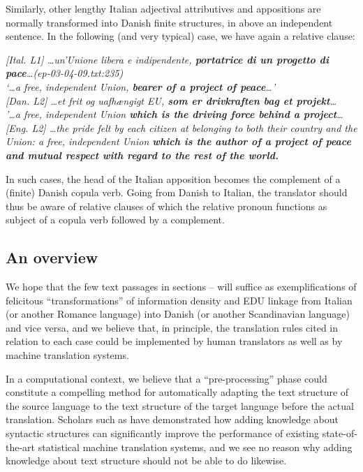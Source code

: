 \documentclass[output=paper]{LSP/langsci}
\begin{document}
Similarly, other lengthy Italian adjectival attributives and appositions are normally transformed into Danish finite structures, in  above an independent sentence. In the following (and very typical) case, we have again a relative clause:

\ea\label{ex:korzen:23}
\textit{\textup{[Ital. L1] }\ldots un'Unione libera e indipendente, \textbf{portatrice di un progetto di pace}\ldots  \textup{(ep-03-04-09.txt:235)}\\
\textup{  `\ldots }a free, independent Union, \textbf{bearer of a project of peace}\ldots '\\
\textup{[Dan. L2] }\ldots et frit og uafhængigt EU, \textbf{som er drivkraften bag et projekt}\ldots \\
'\ldots  a free, independent Union \textbf{which is the driving force behind a project}\ldots \\
  \textup{[Eng. L2] }\ldots the pride felt by each citizen at belonging to both their country and the Union: a free, independent Union \textbf{which is the author of a project of peace and mutual respect with regard to the rest of the world.}}
\z

In such cases, the head of the Italian apposition becomes the complement of a (finite) Danish copula verb. Going from Danish to Italian, the translator should thus be aware of relative clauses of which the relative pronoun functions as subject of a copula verb followed by a complement. 

\subsection{An overview}\label{sec:korzen:4.3}

We hope that the few text passages in sections -- will suffice as exemplifications of felicitous ``transformations'' of information density and EDU linkage from Italian (or another Romance language) into Danish (or another Scandinavian language) and vice versa, and we believe that, in principle, the translation rules cited in relation to each case could be implemented by human translators as well as by machine translation systems.

In a computational context, we believe that a ``pre-processing'' phase could constitute a compelling method for automatically adapting the text structure of the source language to the text structure of the target language before the actual translation. Scholars such as \citet{CollinsEtAl2005} have demonstrated how adding knowledge about syntactic structures can significantly improve the performance of existing state-of-the-art statistical machine translation systems, and we see no reason why adding knowledge about text structure should not be able to do likewise.
\end{document}
